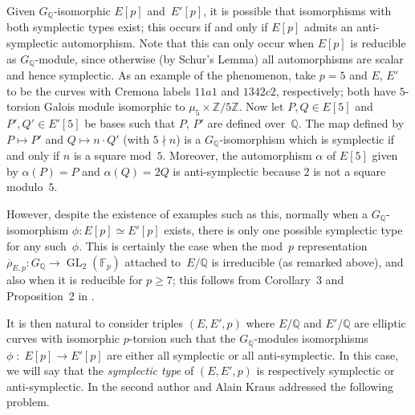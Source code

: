 \documentclass[12pt]{amsart}
\newcommand{\F}{\mathbb{F}}
\newcommand{\Q}{\mathbb{Q}}
\newcommand{\Z}{\mathbb{Z}}
\newcommand{\rhobar}{{\overline{\rho}}}
\newcommand{\GL}{\operatorname{GL}}
\numberwithin{equation}{section}
\theoremstyle{definition}
\theoremstyle{remark}
\begin{document}

Given $G_\Q$-isomorphic $E[p]$ and~$E'[p]$, it is possible that
isomorphisms with both symplectic types exist; this occurs if and only
if $E[p]$ admits an anti-symplectic automorphism.  Note that this can
only occur when $E[p]$ is reducible as $G_{\Q}$-module, since
otherwise (by Schur's Lemma) all automorphisms are scalar and hence
symplectic.  As an example of the phenomenon, take $p=5$ and $E$, $E'$
to be the curves with Cremona labels $11a1$ and $1342c2$,
respectively; both have $5$-torsion Galois module isomorphic to $\mu_5
\times \Z/5\Z$.  Now let $P,Q \in E[5]$ and $P',Q' \in E'[5]$ be bases
such that $P$, $P'$ are defined over~$\Q$.  The map defined by $P
\mapsto P'$ and $Q \mapsto n\cdot Q'$ (with $5 \nmid n$) is a
$G_\Q$-isomorphism which is symplectic if and only if $n$ is a square
mod~$5$.  Moreover, the automorphism $\alpha$ of $E[5]$ given by
$\alpha(P) = P$ and $\alpha(Q) = 2Q$ is anti-symplectic because $2$ is
not a square modulo~$5$.

However, despite the existence of examples such as this, normally when
a $G_\Q$-isomorphism $\phi : E[p] \simeq E'[p]$ exists, there is only
one possible symplectic type for any such~$\phi$.  This is certainly
the case when the mod~$p$ representation $\rhobar_{E,p} : G_\Q \to
\GL_2(\F_p)$ attached to~$E/\Q$ is irreducible (as remarked above),
and also when it is reducible for $p \geq 7$; this follows from
Corollary~3 and Proposition~2 in \cite{FKSym}.

It is then natural to consider triples $(E,E',p)$ where $E/\Q$ and
$E'/\Q$ are elliptic curves with isomorphic $p$-torsion such that the
$G_\Q$-modules isomorphisms $\phi \; : \; E[p] \rightarrow E'[p]$ are
either all symplectic or all anti-symplectic.  In this case, we will
say that the {\it symplectic type} of $(E,E',p)$ is respectively
symplectic or anti-symplectic.  In \cite{FKSym} the second author and
Alain Kraus addressed the following problem.
\end{document}
